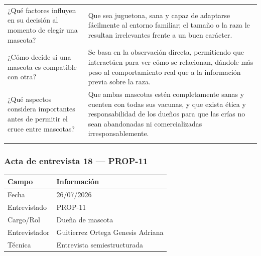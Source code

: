 \documentclass[journal,onecolumn]{IEEEtran}
\begin{document}
{\begin{longtable}{@{}p{5.6cm} p{9.4cm}@{}}
			¿Qué factores influyen en su decisión al momento de elegir una mascota? & Que sea juguetona, sana y capaz de adaptarse fácilmente al entorno familiar; el tamaño o la raza le resultan irrelevantes frente a un buen carácter. \\ \addlinespace
			
			¿Cómo decide si una mascota es compatible con otra? & Se basa en la observación directa, permitiendo que interactúen para ver cómo se relacionan, dándole más peso al comportamiento real que a la información previa sobre la raza. \\ \addlinespace
			
			¿Qué aspectos considera importantes antes de permitir el cruce entre mascotas? & Que ambas mascotas estén completamente sanas y cuenten con todas sus vacunas, y que exista ética y responsabilidad de los dueños para que las crías no sean abandonadas ni comercializadas irresponsablemente. \\ \addlinespace
			
		\end{longtable}
	}
	
	
	\subsubsection*{Acta de entrevista 18 --- PROP-11}
	
	\begin{table}[H]
		\centering\small
		\begin{tabularx}{\textwidth}{@{}l X@{}}
			\toprule
			\textbf{Campo} & \textbf{Información} \\
			\midrule
			
			Fecha & 26/07/2026 \\
			
			Entrevistado & PROP-11 \\
			
			Cargo/Rol & Dueña de mascota \\
			
			Entrevistador & Guitierrez Ortega Genesis Adriana \\
			
			Técnica & Entrevista semiestructurada \\
			
			\bottomrule
		\end{tabularx}
	\end{table}
	
\end{document}
